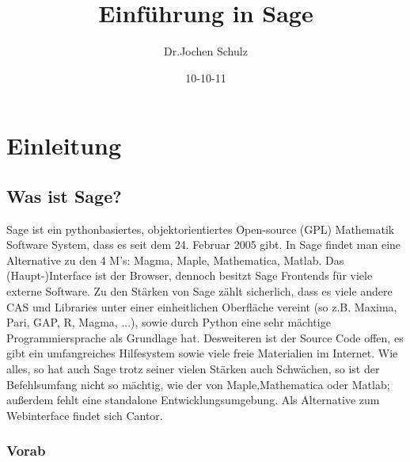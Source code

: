 \documentclass[fontsize=12pt,paper=a4,twoside,bibtotoc,idxtotoc,
liststotoc,pagesize,BCOR1.2cm,DIV15,chapterprefix,pagesize=pdftex]{scrbook}
\title{Einführung in Sage}
\author{Dr.Jochen Schulz}
\date{10-10-11}
\theoremstyle{plain}
\theoremstyle{definition}
\theoremstyle{remark}
\begin{document}
\maketitle
\tableofcontents

\chapter{Einleitung}
\section{Was ist Sage?}

Sage ist ein pythonbasiertes, objektorientiertes Open-source (GPL) Mathematik Software System, dass es seit dem 24. Februar 2005 gibt.
In Sage findet man eine Alternative zu den 4 M's: Magma, Maple, Mathematica, Matlab.
Das (Haupt-)Interface ist der Browser, dennoch besitzt Sage Frontends für viele externe Software.
Zu den Stärken von Sage zählt sicherlich, dass es viele andere CAS und Libraries unter einer einheitlichen Oberfläche vereint 
(so z.B. Maxima, Pari, GAP, R, Magma, ...), sowie durch Python eine sehr mächtige Programmiersprache als Grundlage hat. Desweiteren 
ist der Source Code offen, es gibt ein umfangreiches Hilfesystem sowie viele freie Materialien im Internet.
Wie alles, so hat auch Sage trotz seiner vielen Stärken auch Schwächen, so ist der Befehlsumfang nicht so mächtig, wie der von Maple,Mathematica 
oder Matlab; außerdem fehlt eine standalone Entwicklungsumgebung. Als Alternative zum Webinterface findet sich Cantor.

\subsection{Vorab}
\end{document}
